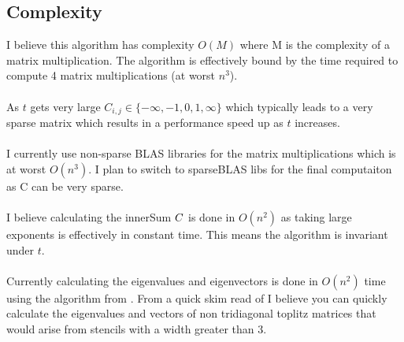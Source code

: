 \documentclass{article}
\begin{document}
\subsection*{Complexity}
I believe this algorithm has complexity $O(M)$ where M is the complexity of a matrix multiplication. 
The algorithm is effectively bound by the time required to compute 4 matrix multiplications (at worst $n^3$). \\ \\
As $t$ gets very large $C_{i,j} \in \{- \infty, -1, 0, 1, \infty\}$ which typically leads to a very sparse matrix 
which results in a performance speed up as $t$ increases.\\ \\
I currently use non-sparse BLAS libraries for the matrix multiplications which is at worst $O(n^3)$. 
I plan to switch to sparseBLAS libs for the final computaiton as C can be very sparse.  \\ \\
I believe calculating the innerSum $C$ is done in $O(n^2)$ as taking large exponents is effectively in constant time. 
This means the algorithm is invariant under $t$. \\ \\ 
Currently calculating the eigenvalues and eigenvectors is done in $O(n^2)$ time using the algorithm from \cite{noschese2013tridiagonal}.
From a quick skim read of \cite{bogoya2022fast} I believe you can quickly calculate the eigenvalues and vectors of non tridiagonal toplitz 
matrices that would arise from stencils with a width greater than 3.  
\end{document}
